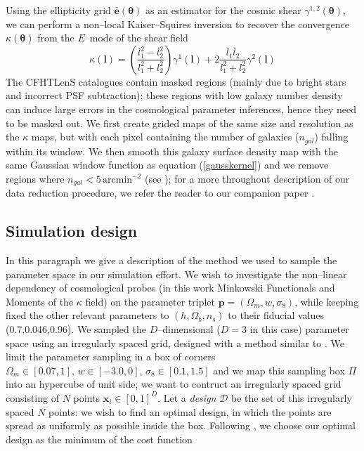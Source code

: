 \documentclass[reprint,aps,prd,superscriptaddress,showkeys,showpacs]{revtex4-1}
\begin{document}
%
Using the ellipticity grid $\bar{\mathbf{e}}(\pmb{\theta})$ as an estimator for the cosmic shear $\gamma^{1,2}(\pmb{\theta})$, we can perform a non--local Kaiser--Squires inversion to recover the convergence $\kappa(\pmb{\theta})$ from the $E$--mode of the shear field
%
\begin{equation}
\kappa(\mathbf{l}) = \left(\frac{l_1^2-l_2^2}{l_1^2+l_2^2}\right)\gamma^1(\mathbf{l}) + 2\frac{l_1l_2}{l_1^2+l_2^2}\gamma^2(\mathbf{l})
\end{equation}
%
The CFHTLenS catalogues contain masked regions (mainly due to bright stars and incorrect PSF subtraction); these regions with low galaxy number density can induce large errors in the cosmological parameter inferences, hence they need to be masked out. We first create grided maps of the same size and resolution as the $\kappa$ maps, but with each pixel containing the number of galaxies ($n_{gal}$) falling within its window. We then smooth this galaxy surface density map with the same Gaussian window function as equation (\ref{gausskernel}) and we remove regions where $n_{gal} < 5 \,\mathrm{arcmin}^{−2}$ (see \citep{CFHTMasato}); for a more throughout description of our data reduction procedure, we refer the reader to our companion paper \citep{Companion}. 

\subsection{Simulation design}
In this paragraph we give a description of the method we used to sample the parameter space in our simulation effort. We wish to investigate the non--linear dependency of cosmological probes (in this work Minkowski Functionals and Moments of the $\kappa$ field) on the parameter triplet $\mathbf{p}=(\Omega_m,w,\sigma_8)$, while keeping fixed the other relevant parameters to $(h,\Omega_b,n_s)$ to their fiducial values (0.7,0.046,0.96). We sampled the $D$--dimensional ($D=3$ in this case) parameter space using an irregularly spaced grid, designed with a method similar to \citep{coyote2}. We limit the parameter sampling in a box of corners $\Omega_m\in[0.07,1],\,w\in[-3.0,0],\,\sigma_8\in[0.1,1.5]$ and we map this sampling box $\Pi$ into an hypercube of unit side; we want to contruct an irregularly spaced grid consisting of $N$ points $\mathbf{x}_i\in[0,1]^D$. Let a \textit{design} $\mathcal{D}$ be the set of this irregularly spaced $N$ points: we wish to find an optimal design, in which the points are spread as uniformly as possible inside the box. Following \citep{coyote2}, we choose our optimal design as the minimum of the cost function
\end{document}
